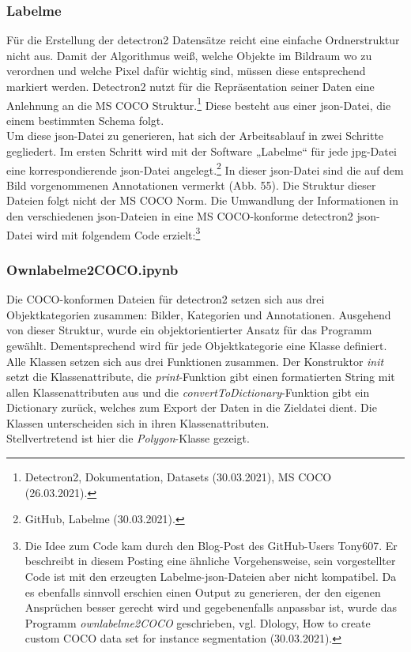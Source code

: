 \documentclass[a4paper,12pt,ngerman]{article}
\begin{document}
\subsubsection{Labelme}
Für die Erstellung der detectron2 Datensätze reicht eine einfache Ordnerstruktur nicht aus. Damit der Algorithmus weiß, welche Objekte im Bildraum wo zu verordnen und welche Pixel dafür wichtig sind, müssen diese entsprechend markiert werden. Detectron2 nutzt für die Repräsentation seiner Daten eine Anlehnung an die MS COCO Struktur.\footnote{Detectron2, Dokumentation, Datasets (30.03.2021), MS COCO (26.03.2021).} Diese besteht aus einer json-Datei, die einem bestimmten Schema folgt. \\
Um diese json-Datei zu generieren, hat sich der Arbeitsablauf in zwei Schritte gegliedert. Im ersten Schritt wird mit der Software „Labelme“ für jede jpg-Datei eine korrespondierende json-Datei angelegt.\footnote{GitHub, Labelme (30.03.2021).} In dieser json-Datei sind die auf dem Bild vorgenommenen Annotationen vermerkt (Abb. 55). Die Struktur dieser Dateien folgt nicht der MS COCO Norm. Die Umwandlung der Informationen in den verschiedenen json-Dateien in eine MS COCO-konforme detectron2 json-Datei wird mit folgendem Code erzielt:\footnote{Die Idee zum Code kam durch den Blog-Post des GitHub-Users Tony607. Er beschreibt in diesem Posting eine ähnliche Vorgehensweise, sein vorgestellter Code ist mit den erzeugten Labelme-json-Dateien aber nicht kompatibel. Da es ebenfalls sinnvoll erschien einen Output zu generieren, der den eigenen Ansprüchen besser gerecht wird und gegebenenfalls anpassbar ist, wurde das Programm \textit{ownlabelme2COCO} geschrieben, vgl. Dlology, How to create custom COCO data set for instance segmentation (30.03.2021).}\\

\subsubsection*{Ownlabelme2COCO.ipynb}

Die COCO-konformen Dateien für detectron2 setzen sich aus drei Objektkategorien zusammen: Bilder, Kategorien und Annotationen. Ausgehend von dieser Struktur, wurde ein objektorientierter Ansatz für das Programm gewählt. Dementsprechend wird für jede Objektkategorie eine Klasse definiert.\\
Alle Klassen setzen sich aus drei Funktionen zusammen. Der Konstruktor \textit{init} setzt die Klassenattribute, die \textit{print}-Funktion gibt einen formatierten String mit allen Klassenattributen aus und die \textit{convertToDictionary}-Funktion gibt ein Dictionary zurück, welches zum Export der Daten in die Zieldatei dient. Die Klassen unterscheiden sich in ihren Klassenattributen.\\
Stellvertretend ist hier die \textit{Polygon}-Klasse gezeigt. \\
\end{document}

